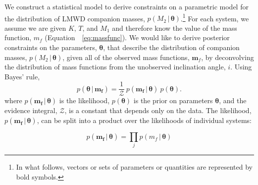 \documentclass[apjl]{emulateapj}
\newcommand{\given}{\,|\,}
\newcommand{\bs}[1]{\boldsymbol{#1}}
\newcommand{\eqn}{Equation~}
\newcommand{\mf}{m_f}
\begin{document}
We construct a statistical model to derive constraints on a parametric model for the distribution of LMWD companion masses, $p(M_2 \given \bs{\theta})$.\footnote{In what follows, vectors or sets of parameters or quantities are represented by bold symbols.} For each system, we assume we are given $K$, $T$, and $M_1$ and therefore know the value of the mass function, $\mf$ (\eqn~\ref{eq:massfunc}). We would like to derive posterior constraints on the parameters, $\bs{\theta}$, that describe the distribution of companion masses, $p(M_2\given \bs{\theta})$, given all of the observed mass functions, $\bs{m}_f$, by deconvolving the distribution of mass functions from the unobserved inclination angle, $i$. Using Bayes' rule,
\begin{equation}
    p(\bs{\theta} \given \bs{\mf}) = \frac{1}{\mathcal{Z}}~p(\bs{\mf} \given \bs{\theta})~p(\bs{\theta}).
\end{equation}
where $p(\bs{\mf} \given \bs{\theta})$ is the likelihood, $p(\bs{\theta})$ is the prior on parameters $\bs{\theta}$, and the evidence integral, $\mathcal{Z}$, is a constant that depends only on the data. The likelihood, $p(\bs{\mf} \given \bs{\theta})$, can be split into a product over the likelihoods of individual systems:

\begin{equation}
p(\bs{\mf} \given \bs{\theta}) = \prod_j p(\mf \given \bs{\theta})
\end{equation}
\end{document}
